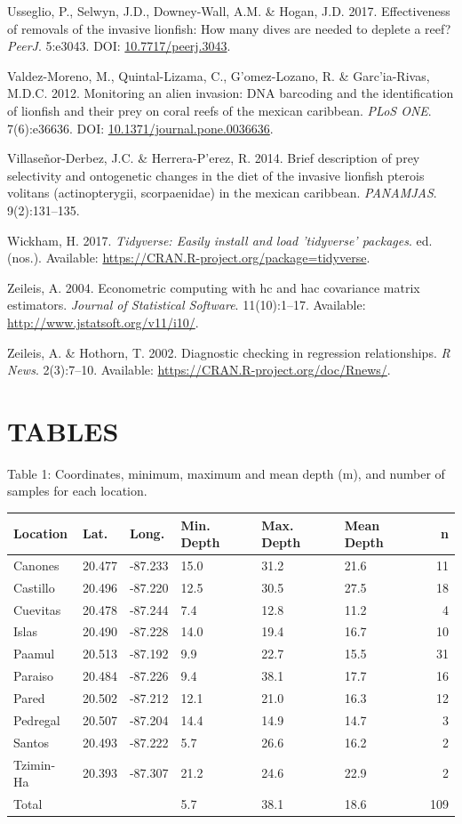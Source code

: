 \documentclass[12pt,]{article}
\begin{document}
\hypertarget{ref-usseglio_2017}{}
Usseglio, P., Selwyn, J.D., Downey-Wall, A.M. \& Hogan, J.D. 2017.
Effectiveness of removals of the invasive lionfish: How many dives are
needed to deplete a reef? \emph{PeerJ}. 5:e3043. DOI:
\href{https://doi.org/10.7717/peerj.3043}{10.7717/peerj.3043}.

\hypertarget{ref-valdezmoreno_2012}{}
Valdez-Moreno, M., Quintal-Lizama, C., G\a'omez-Lozano, R. \&
Garc\a'ia-Rivas, M.D.C. 2012. Monitoring an alien invasion: DNA
barcoding and the identification of lionfish and their prey on coral
reefs of the mexican caribbean. \emph{PLoS ONE}. 7(6):e36636. DOI:
\href{https://doi.org/10.1371/journal.pone.0036636}{10.1371/journal.pone.0036636}.

\hypertarget{ref-villaseorderbez_2014}{}
Villaseñor-Derbez, J.C. \& Herrera-P\a'erez, R. 2014. Brief description
of prey selectivity and ontogenetic changes in the diet of the invasive
lionfish pterois volitans (actinopterygii, scorpaenidae) in the mexican
caribbean. \emph{PANAMJAS}. 9(2):131--135.

\hypertarget{ref-tidyverse_2017}{}
Wickham, H. 2017. \emph{Tidyverse: Easily install and load 'tidyverse'
packages}. ed. (nos.). Available:
\url{https://CRAN.R-project.org/package=tidyverse}.

\hypertarget{ref-sandwich_2014}{}
Zeileis, A. 2004. Econometric computing with hc and hac covariance
matrix estimators. \emph{Journal of Statistical Software}. 11(10):1--17.
Available: \url{http://www.jstatsoft.org/v11/i10/}.

\hypertarget{ref-lmtest_2002}{}
Zeileis, A. \& Hothorn, T. 2002. Diagnostic checking in regression
relationships. \emph{R News}. 2(3):7--10. Available:
\url{https://CRAN.R-project.org/doc/Rnews/}.

\clearpage

\section{TABLES}\label{tables}

Table 1: Coordinates, minimum, maximum and mean depth (m), and number of
samples for each location.

\begin{longtable}[]{@{}llllllr@{}}
\toprule
Location & Lat. & Long. & Min. Depth & Max. Depth & Mean Depth &
n\tabularnewline
\midrule
\endhead
Canones & 20.477 & -87.233 & 15.0 & 31.2 & 21.6 & 11\tabularnewline
Castillo & 20.496 & -87.220 & 12.5 & 30.5 & 27.5 & 18\tabularnewline
Cuevitas & 20.478 & -87.244 & 7.4 & 12.8 & 11.2 & 4\tabularnewline
Islas & 20.490 & -87.228 & 14.0 & 19.4 & 16.7 & 10\tabularnewline
Paamul & 20.513 & -87.192 & 9.9 & 22.7 & 15.5 & 31\tabularnewline
Paraiso & 20.484 & -87.226 & 9.4 & 38.1 & 17.7 & 16\tabularnewline
Pared & 20.502 & -87.212 & 12.1 & 21.0 & 16.3 & 12\tabularnewline
Pedregal & 20.507 & -87.204 & 14.4 & 14.9 & 14.7 & 3\tabularnewline
Santos & 20.493 & -87.222 & 5.7 & 26.6 & 16.2 & 2\tabularnewline
Tzimin-Ha & 20.393 & -87.307 & 21.2 & 24.6 & 22.9 & 2\tabularnewline
Total & & & 5.7 & 38.1 & 18.6 & 109\tabularnewline
\bottomrule
\end{longtable}
\end{document}
